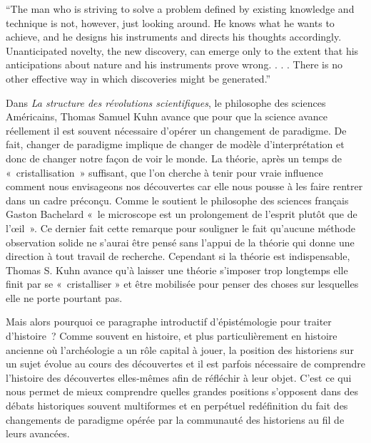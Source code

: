 \documentclass[11pt,a4paper]{article}
\begin{document}
\thispagestyle{empty}
\par\medskip
{}
\smallskip{}
\medskip
\noindent{\color{accent}\rule{\linewidth}{0.8pt}}\par\smallskip
{}\par\bigskip

``The man who is striving to solve a problem defined by existing knowledge and technique is not, however, just looking around. He knows what he wants to achieve, and he designs his instruments and directs his thoughts accordingly. Unanticipated novelty, the new discovery, can emerge only to the extent that his anticipations about nature and his instruments prove wrong. . . . There is no other effective way in which discoveries might be generated.''

Dans \emph{La structure des révolutions scientifiques}, le philosophe des sciences Américains, Thomas Samuel Kuhn avance que pour que la science avance réellement il est souvent nécessaire d'opérer un changement de paradigme. De fait, changer de paradigme implique de changer de modèle d'interprétation et donc de changer notre façon de voir le monde. La théorie, après un temps de «~cristallisation~» suffisant, que l'on cherche à tenir pour vraie influence comment nous envisageons nos découvertes car elle nous pousse à les faire rentrer dans un cadre préconçu. Comme le soutient le philosophe des sciences français Gaston Bachelard «~le microscope est un prolongement de l'esprit plutôt que de l'œil~». Ce dernier fait cette remarque pour souligner le fait qu'aucune méthode observation solide ne s'aurai être pensé sans l'appui de la théorie qui donne une direction à tout travail de recherche. Cependant si la théorie est indispensable, Thomas S. Kuhn avance qu'à laisser une théorie s'imposer trop longtemps elle finit par se «~cristalliser » et être mobilisée pour penser des choses sur lesquelles elle ne porte pourtant pas.

Mais alors pourquoi ce paragraphe introductif d'épistémologie pour traiter d'histoire~? Comme souvent en histoire, et plus particulièrement en histoire ancienne où l'archéologie a un rôle capital à jouer, la position des historiens sur un sujet évolue au cours des découvertes et il est parfois nécessaire de comprendre l'histoire des découvertes elles-mêmes afin de réfléchir à leur objet. C'est ce qui nous permet de mieux comprendre quelles grandes positions s'opposent dans des débats historiques souvent multiformes et en perpétuel redéfinition du fait des changements de paradigme opérée par la communauté des historiens au fil de leurs avancées.
\end{document}
